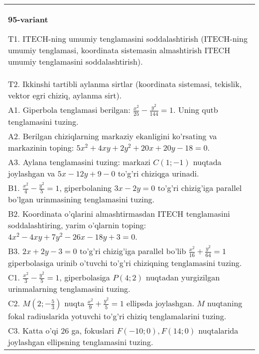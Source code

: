 \documentclass{article}
\begin{document}
\begin{tabular}{m{17cm}}
\textbf{95-variant}
\newline

T1. ITECH-ning umumiy tenglamasini soddalashtirish (ITECH-ning umumiy tenglamasi, koordinata sistemasin almashtirish ITECH umumiy tenglamasini soddalashtirish).\\

T2. Ikkinshi tartibli aylanma sirtlar (koordinata sistemasi, tekislik, vektor egri chiziq, aylanma sirt).\\

A1. Giperbola tenglamasi berilgan: $\frac{x^{2}}{25}-\frac{y^{2}}{144}=1$. Uning qutb tenglamasini tuzing.\\

A2. Berilgan chiziqlarning markaziy ekanligini ko'rsating va markazinin toping: $5x^{2}+4xy+2y^{2}+20x+20y-18=0$.\\

A3. Aylana tenglamasini tuzing: markazi $C(1;-1)$ nuqtada joylashgan va $5x-12y+9-0$ to'g'ri chiziqga urinadi.\\

B1. $\frac{x^{2}}{4} - \frac{y^{2}}{5} = 1$, giperbolaning $3x - 2y = 0$ to'g'ri chizig'iga parallel bo'lgan urinmasining tenglamasini tuzing.  \\

B2. Koordinata o'qlarini almashtirmasdan ITECH tenglamasini soddalashtiring, yarim o'qlarnin toping: $4x^{2} - 4xy + 7y^{2} - 26x - 18y + 3 = 0$.\\

B3. $2x + 2y - 3 = 0$ to'g'ri chizig'iga parallel bo'lib $\frac{x^{2}}{16} + \frac{y^{2}}{64} = 1$ giperbolasiga urinib o'tuvchi to'g'ri chiziqning tenglamasini tuzing.  \\

C1. $\frac{x^{2}}{3} - \frac{y^{2}}{5} = 1$, giperbolasiga $P(4;2)$ nuqtadan yurgizilgan urinmalarning tenglamasini tuzing.  \\

C2. $M(2; - \frac{5}{3})$ nuqta $\frac{x^{2}}{9} + \frac{y^{2}}{5} = 1$ ellipsda joylashgan. $M$ nuqtaning fokal radiuslarida yotuvchi to'g'ri chiziq tenglamalarini tuzing.  \\

C3. Katta o'qi 26 ga, fokuslari $F( - 10;0), F(14;0)$ nuqtalarida joylashgan ellipsning tenglamasini tuzing.  \\

\end{tabular}
\vspace{1cm}
\end{document}
